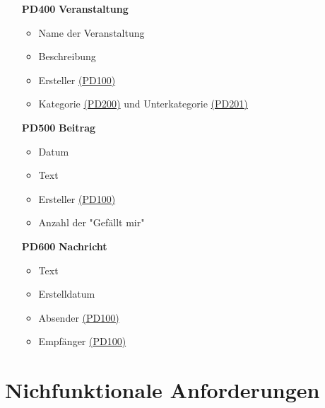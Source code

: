 \documentclass[parskip=full]{scrartcl}
\begin{document}
\begin{itemize}
			\item[\textbf{PD400}] \textbf{Veranstaltung} \label{sec:PD400}
			\begin{itemize}[nosep]
				\item Name der Veranstaltung
				\item Beschreibung
				\item Ersteller \hyperref[sec:PD100]{(PD100)}
				\item \gls{Kategorie} \hyperref[sec:PD200]{(PD200)} und \gls{Unterkategorie} \hyperref[sec:PD201]{(PD201)}
			\end{itemize}
			\item[\textbf{PD500}] \textbf{Beitrag} \label{sec:PD500}
			\begin{itemize}[nosep]
				\item Datum
				\item Text
				\item Ersteller \hyperref[sec:PD100]{(PD100)}
				\item Anzahl der "Gefällt mir"
			\end{itemize}
			\item[\textbf{PD600}] \textbf{Nachricht} \label{sec:PD600}
			\begin{itemize}[nosep]
				\item Text
				\item Erstelldatum
				\item Absender \hyperref[sec:PD100]{(PD100)}
				\item Empfänger \hyperref[sec:PD100]{(PD100)}	
			\end{itemize}
		\end{itemize}
		
		\newpage
		\section{Nichfunktionale Anforderungen}
		
\end{document}
